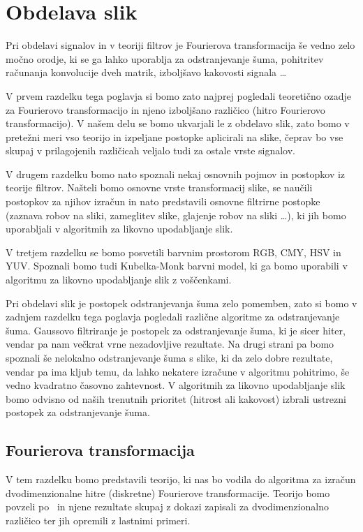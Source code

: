 \chapter{Obdelava slik}\label{sec:ObdelavaSlik}
%
Pri obdelavi signalov in v teoriji filtrov je Fourierova transformacija še vedno zelo močno orodje, ki se ga lahko uporablja za odstranjevanje šuma, pohitritev računanja konvolucije dveh matrik, izboljšavo kakovosti signala \ldots

V prvem razdelku tega poglavja si bomo zato najprej pogledali teoretično ozadje za Fourierovo transformacijo in njeno izboljšano različico (hitro Fourierovo transformacijo). V našem delu se bomo ukvarjali le z obdelavo slik, zato bomo v pretežni meri vso teorijo in izpeljane postopke aplicirali na slike, čeprav bo vse skupaj v prilagojenih različicah veljalo tudi za ostale vrste signalov.

V drugem razdelku bomo nato spoznali nekaj osnovnih pojmov in postopkov iz teorije filtrov. Našteli bomo osnovne vrste transformacij slike, se naučili postopkov za njihov izračun in nato predstavili osnovne filtrirne postopke (zaznava robov na sliki, zameglitev slike, glajenje robov na sliki \ldots), ki jih bomo uporabljali v algoritmih za likovno upodabljanje slik.

V tretjem razdelku se bomo posvetili barvnim prostorom RGB, CMY, HSV in YUV. Spoznali bomo tudi Kubelka-Monk barvni model, ki ga bomo uporabili v algoritmu za likovno upodabljanje slik z voščenkami.

Pri obdelavi slik je postopek odstranjevanja šuma zelo pomemben, zato si bomo v zadnjem razdelku tega poglavja pogledali različne algoritme za odstranjevanje šuma. Gaussovo filtriranje je postopek za odstranjevanje šuma, ki je sicer hiter, vendar pa nam večkrat vrne nezadovljive rezultate. Na drugi strani pa bomo spoznali še nelokalno odstranjevanje šuma s slike, ki da zelo dobre rezultate, vendar pa ima kljub temu, da lahko nekatere izračune v algoritmu pohitrimo, še vedno kvadratno časovno zahtevnost. V algoritmih za likovno upodabljanje slik bomo odvisno od naših trenutnih prioritet (hitrost ali kakovost) izbrali ustrezni postopek za odstranjevanje šuma.
%
\section{Fourierova transformacija}\label{sec:FourierT}
%
V tem razdelku bomo predstavili teorijo, ki nas bo vodila do algoritma za izračun dvodimenzionalne hitre (diskretne) Fourierove transformacije. Teorijo bomo povzeli po~\cite[2.~poglavje]{Frazier:AnIntro} in njene rezultate skupaj z dokazi zapisali za dvodimenzionalno različico ter jih opremili z lastnimi primeri.
